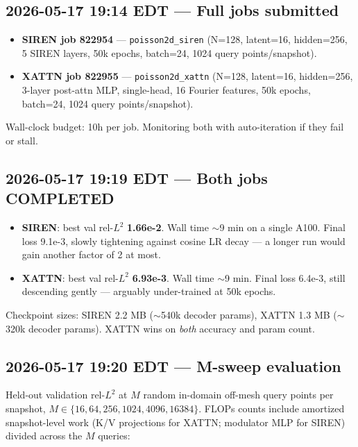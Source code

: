 \documentclass[11pt]{article}
\begin{document}
\subsection*{2026-05-17 19:14 EDT --- Full jobs submitted}
\begin{itemize}
\item \textbf{SIREN job 822954} --- \texttt{poisson2d\_siren} (N=128,
      latent=16, hidden=256, 5 SIREN layers, 50k epochs, batch=24, 1024
      query points/snapshot).
\item \textbf{XATTN job 822955} --- \texttt{poisson2d\_xattn} (N=128,
      latent=16, hidden=256, 3-layer post-attn MLP, single-head, 16
      Fourier features, 50k epochs, batch=24, 1024 query points/snapshot).
\end{itemize}
Wall-clock budget: 10h per job. Monitoring both with auto-iteration if
they fail or stall.

\subsection*{2026-05-17 19:19 EDT --- Both jobs COMPLETED}
\begin{itemize}
\item \textbf{SIREN}: best val rel-$L^2$ \textbf{1.66e-2}. Wall time
      $\sim$9 min on a single A100. Final loss 9.1e-3, slowly tightening
      against cosine LR decay --- a longer run would gain another factor
      of 2 at most.
\item \textbf{XATTN}: best val rel-$L^2$ \textbf{6.93e-3}. Wall time
      $\sim$9 min. Final loss 6.4e-3, still descending gently --- arguably
      under-trained at 50k epochs.
\end{itemize}
Checkpoint sizes: SIREN 2.2 MB ($\sim$540k decoder params), XATTN 1.3 MB
($\sim$320k decoder params). XATTN wins on \emph{both} accuracy and param
count.

\subsection*{2026-05-17 19:20 EDT --- M-sweep evaluation}
Held-out validation rel-$L^2$ at $M$ random in-domain off-mesh query points
per snapshot, $M \in \{16, 64, 256, 1024, 4096, 16384\}$. FLOPs counts
include amortized snapshot-level work (K/V projections for XATTN; modulator
MLP for SIREN) divided across the $M$ queries:
\end{document}
